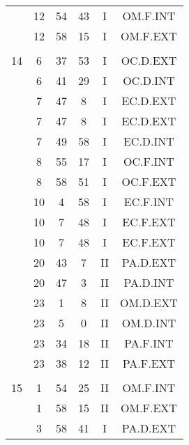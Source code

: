\documentclass[12pt, a4paper]{article}
\begin{document}
\begin{multicols}{3}
{\begin{tabular}{c c c c c c}
	 	 	 	 & 12 & 54 & 43 & I & OM.F.INT\\%
	 	 	 	 & 12 & 58 & 15 & I & OM.F.EXT\\%
	 	 	 	 & & & & & \\%
	 	 	 	14 & 6 & 37 & 53 & I & OC.D.EXT\\%
	 	 	 	 & 6 & 41 & 29 & I & OC.D.INT\\%
	 	 	 	 & 7 & 47 & 8 & I & EC.D.EXT\\%
	 	 	 	 & 7 & 47 & 8 & I & EC.D.EXT\\%
	 	 	 	 & 7 & 49 & 58 & I & EC.D.INT\\%
	 	 	 	 & 8 & 55 & 17 & I & OC.F.INT\\%
	 	 	 	 & 8 & 58 & 51 & I & OC.F.EXT\\%
	 	 	 	 & 10 & 4 & 58 & I & EC.F.INT\\%
	 	 	 	 & 10 & 7 & 48 & I & EC.F.EXT\\%
	 	 	 	 & 10 & 7 & 48 & I & EC.F.EXT\\%
	 	 	 	 & 20 & 43 & 7 & II & PA.D.EXT\\%
	 	 	 	 & 20 & 47 & 3 & II & PA.D.INT\\%
	 	 	 	 & 23 & 1 & 8 & II & OM.D.EXT\\%
	 	 	 	 & 23 & 5 & 0 & II & OM.D.INT\\%
	 	 	 	 & 23 & 34 & 18 & II & PA.F.INT\\%
	 	 	 	 & 23 & 38 & 12 & II & PA.F.EXT\\%
	 	 	 	 & & & & & \\%
	 	 	 	15 & 1 & 54 & 25 & II & OM.F.INT\\%
	 	 	 	 & 1 & 58 & 15 & II & OM.F.EXT\\%
	 	 	 	 & 3 & 58 & 41 & I & PA.D.EXT\\%

\end{tabular}}
\end{multicols}
\end{document}
